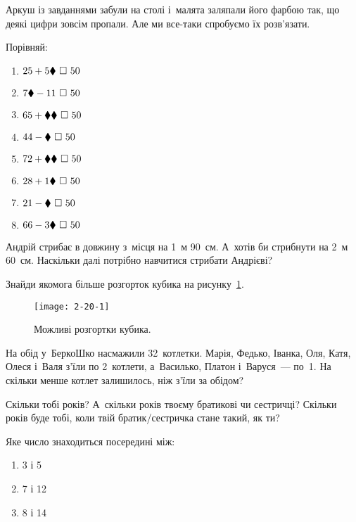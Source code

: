 \problem
Аркуш із завданнями забули на столі і~малята заляпали його фарбою так,
що деякі цифри зовсім пропали.
Але ми все-таки спробуємо їх розв’язати.

Порівняй:
\begin{multicols}{2}
  \begin{enumerate}
    \item $25 + 5\hiddendigit \ \square \ 50$
    \item $7\hiddendigit - 11 \ \square \ 50$
    \item $65 + \hiddendigit\hiddendigit \ \square \ 50$
    \item $44 - \hiddendigit \ \square \ 50$
    \item $72 + \hiddendigit\hiddendigit \ \square \ 50$
    \item $28 + 1\hiddendigit \ \square \ 50$
    \item $21 - \hiddendigit \ \square \ 50$
    \item $66 - 3\hiddendigit \ \square \ 50$
  \end{enumerate}
\end{multicols}


\problem
Андрій стрибає в довжину з~місця на 1~м 90~см.
А~хотів би стрибнути на 2~м 60~см.
Наскільки далі потрібно навчитися стрибати Андрієві?


\problem
Знайди якомога більше розгорток кубика на рисунку~\ref{fig:cubes}.

\begin{figure}[ht]
  \centering
  \texttt{[image: 2-20-1]}
  \caption{Можливі розгортки кубика.}
  \label{fig:cubes}
\end{figure}


\problem
На обід у~БеркоШко насмажили 32~котлетки.
Марія, Федько, Іванка, Оля, Катя, Олеся і~Валя з’їли по 2~котлети,
а~Василько, Платон і~Варуся~--- по~1.
На скільки менше котлет залишилось, ніж з’їли за обідом?


\problem
Скільки тобі років?
А~скільки років твоєму братикові чи сестричці?
Скільки років буде тобі, коли твій братик/сестричка стане такий, як ти?


\problem
Яке число знаходиться посередині між:
\begin{multicols}{3}
  \begin{enumerate}
    \item 3 і 5
    \item 7 і 12
    \item 8 і 14
  \end{enumerate}
\end{multicols}


